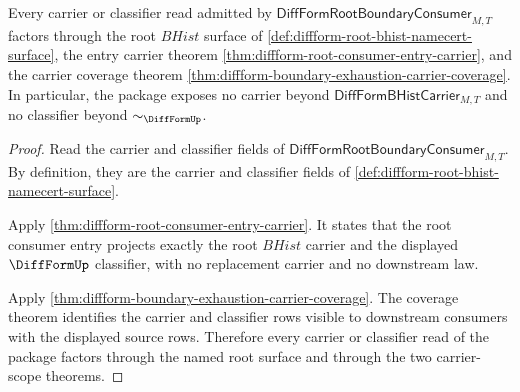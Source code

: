 \begin{theorem}
\label{thm:diffform-root-boundary-consumer-carrier-scope}
Every carrier or classifier read admitted by
$\mathsf{DiffFormRootBoundaryConsumer}_{M,T}$ factors through the root
$BHist$ surface of \autoref{def:diffform-root-bhist-namecert-surface}, the
entry carrier theorem
\autoref{thm:diffform-root-consumer-entry-carrier}, and the carrier coverage
theorem \autoref{thm:diffform-boundary-exhaustion-carrier-coverage}. In
particular, the package exposes no carrier beyond
$\mathsf{DiffFormBHistCarrier}_{M,T}$ and no classifier beyond
$\sim_{\DiffFormUp}$.
\end{theorem}
\begin{proof}
Read the carrier and classifier fields of
$\mathsf{DiffFormRootBoundaryConsumer}_{M,T}$. By definition, they are the
carrier and classifier fields of
\autoref{def:diffform-root-bhist-namecert-surface}.

Apply \autoref{thm:diffform-root-consumer-entry-carrier}. It states that the
root consumer entry projects exactly the root $BHist$ carrier and the
displayed $\DiffFormUp$ classifier, with no replacement carrier and no
downstream law.

Apply \autoref{thm:diffform-boundary-exhaustion-carrier-coverage}. The
coverage theorem identifies the carrier and classifier rows visible to
downstream consumers with the displayed source rows. Therefore every carrier
or classifier read of the package factors through the named root surface and
through the two carrier-scope theorems.
\end{proof}

